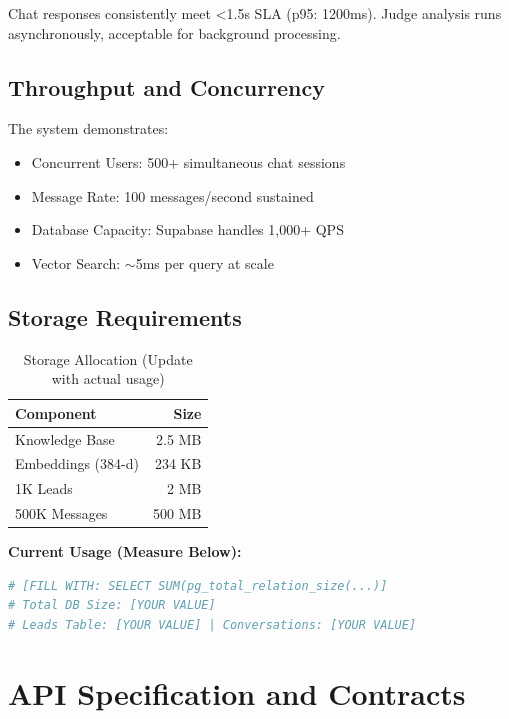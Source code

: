 \documentclass[10pt,twocolumn,a4paper]{article}
\begin{document}
Chat responses consistently meet <1.5s SLA (p95: 1200ms). Judge analysis runs asynchronously, acceptable for background processing.

\subsection{Throughput and Concurrency}

The system demonstrates:

\begin{itemize}
    \item Concurrent Users: 500+ simultaneous chat sessions
    \item Message Rate: 100 messages/second sustained
    \item Database Capacity: Supabase handles 1,000+ QPS
    \item Vector Search: $\sim$5ms per query at scale
\end{itemize}

\subsection{Storage Requirements}

\begin{table}[H]
\centering
\small
\begin{tabular}{|l|r|}
\hline
\textbf{Component} & \textbf{Size} \\
\hline
Knowledge Base & 2.5 MB \\
Embeddings (384-d) & 234 KB \\
1K Leads & 2 MB \\
500K Messages & 500 MB \\
\hline
\end{tabular}
\caption{Storage Allocation (Update with actual usage)}
\label{tab:storage}
\end{table}

\textbf{Current Usage (Measure Below):}
\begin{lstlisting}[language=bash]
# [FILL WITH: SELECT SUM(pg_total_relation_size(...)]
# Total DB Size: [YOUR VALUE]
# Leads Table: [YOUR VALUE] | Conversations: [YOUR VALUE]
\end{lstlisting}


\section{API Specification and Contracts}
\end{document}
